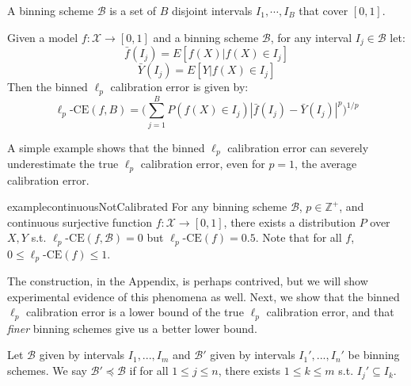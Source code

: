 \begin{definition}
A binning scheme $\mathcal{B}$ is a set of $B$ disjoint intervals $I_1, \cdots, I_B$ that cover $[0, 1]$.
\end{definition}

\begin{definition}
Given a model $f : \mathcal{X} \to [0, 1]$ and a binning scheme $\mathcal{B}$, for any interval $I_j \in \mathcal{B}$ let:
\[ \bar{f}(I_j) = E[f(X) | f(X) \in I_j] \]
\[ \bar{Y}(I_j) = E[Y | f(X) \in I_j] \]
Then the binned $\ell_p$ calibration error is given by:
\[ \ell_p\mbox{-CE}(f, B) = \Big( \sum_{j=1}^B P(f(X) \in I_j) \left|\bar{f}(I_j) - \bar{Y}(I_j) \right|^p  \Big)^{1/p} \]
\end{definition}

A simple example shows that the binned $\ell_p$ calibration error can severely underestimate the true $\ell_p$ calibration error, even for $p=1$, the average calibration error.

\begin{restatable}{example}{continuousNotCalibrated}
\label{ex:continuous-not-calibrated}
For any binning scheme $\mathcal{B}$, $p \in \mathbb{Z}^+$, and continuous surjective function $f : \mathcal{X} \to [0, 1]$, there exists a distribution $P$ over $X, Y$ s.t. $\ell_p\mbox{-CE}(f, \mathcal{B}) = 0$ but $\ell_p\mbox{-CE}(f) = 0.5$.
Note that for all $f$, $0 \leq \ell_p\mbox{-CE}(f) \leq 1$.
\end{restatable}


The construction, in the Appendix, is perhaps contrived, but we will show experimental evidence of this phenomena as well. Next, we show that the binned $\ell_p$ calibration error is a lower bound of the true $\ell_p$ calibration error, and that \emph{finer} binning schemes give us a better lower bound.

\begin{definition}
Let $\mathcal{B}$ given by intervals $I_1, ..., I_m$ and $\mathcal{B}'$ given by intervals $I_1', ..., I_n'$ be binning schemes. We say $\mathcal{B}' \preceq \mathcal{B}$ if for all $1 \leq j \leq n$, there exists $1 \leq k \leq m$ s.t. $I_j' \subseteq I_k$. 
\end{definition}

